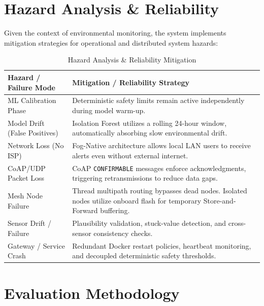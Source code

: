 \documentclass[10pt,a4paper]{article}
\begin{document}
\section{Hazard Analysis \& Reliability}

Given the context of environmental monitoring, the system implements mitigation
strategies for operational and distributed system hazards:

\begin{table}[htbp]
\centering
\setlength{\tabcolsep}{4pt}
\renewcommand{\arraystretch}{1.0}
\caption{Hazard Analysis \& Reliability Mitigation}
\label{tab:hazards}
\small
\begin{tabularx}{\textwidth}{@{} >{\raggedright\arraybackslash}p{3.8cm} >{\raggedright\arraybackslash}X @{}}
\toprule
\textbf{Hazard / Failure Mode} & \textbf{Mitigation / Reliability Strategy} \\
\midrule
ML Calibration Phase
  & Deterministic safety limits remain active independently during model warm-up. \\
\midrule
Model Drift (False Positives)
  & Isolation Forest utilizes a rolling 24-hour window, automatically absorbing slow environmental drift. \\
\midrule
Network Loss (No ISP)
  & Fog-Native architecture allows local LAN users to receive alerts even without external internet. \\
\midrule
CoAP/UDP Packet Loss
  & CoAP \texttt{CONFIRMABLE} messages enforce acknowledgments, triggering retransmissions to reduce data gaps. \\
\midrule
Mesh Node Failure
  & Thread multipath routing bypasses dead nodes. Isolated nodes utilize onboard flash for temporary Store-and-Forward buffering. \\
\midrule
Sensor Drift / Failure
  & Plausibility validation, stuck-value detection, and cross-sensor consistency checks. \\
\midrule
Gateway / Service Crash
  & Redundant Docker restart policies, heartbeat monitoring, and decoupled deterministic safety thresholds. \\
\bottomrule
\end{tabularx}
\end{table}

\section{Evaluation Methodology}
\end{document}
